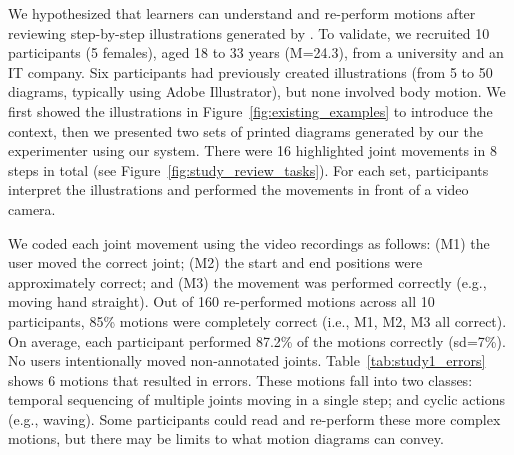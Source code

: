 We hypothesized that learners can understand and re-perform motions after reviewing step-by-step illustrations generated by \systemname{}.
To validate, we recruited 10 participants (5 females), aged 18 to 33 years (M=24.3), from a university and an IT company.
%
Six participants had previously created illustrations (from 5 to 50 diagrams, typically using Adobe Illustrator), but none involved body motion. %
%
%
%
We first showed the illustrations in Figure~\ref{fig:existing_examples} to introduce the context,
%
then we presented two sets of printed diagrams generated by our the experimenter using our system. There were 16 highlighted joint movements in 8 steps in total (see Figure~\ref{fig:study_review_tasks}).
For each set, participants interpret the illustrations and performed the movements in front of a video camera. %
%

We coded each joint movement using the video recordings as follows: (M1) the user moved the correct joint; (M2) the start and end positions were approximately correct; %
 and (M3) the movement was performed correctly (e.g., moving hand straight).
%
Out of 160 re-performed motions across all 10 participants, 85\% motions were completely correct (i.e., M1, M2, M3 all correct). On average, each participant performed 87.2\% of the motions correctly (sd=7\%). No users intentionally moved non-annotated joints.
Table~\ref{tab:study1_errors} shows 6 motions that resulted in errors. These motions fall into two classes: temporal sequencing of multiple joints moving in a single step; and cyclic actions (e.g., waving).
%
Some participants could read and re-perform these more complex motions, but there may be limits to what motion diagrams can convey.
%


